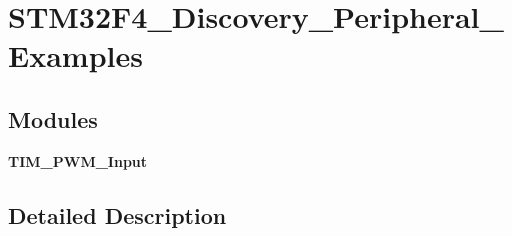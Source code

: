 \section{S\+T\+M32\+F4\+\_\+\+Discovery\+\_\+\+Peripheral\+\_\+\+Examples}
\label{group__STM32F4__Discovery__Peripheral__Examples}
\subsection*{Modules}
\begin{DoxyCompactItemize}
\item 
\textbf{ T\+I\+M\+\_\+\+P\+W\+M\+\_\+\+Input}
\end{DoxyCompactItemize}


\subsection{Detailed Description}
